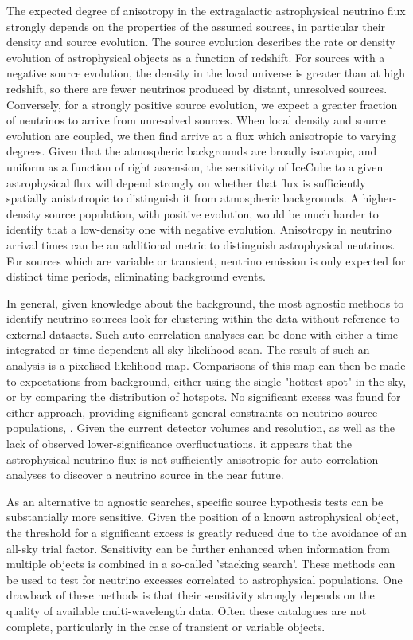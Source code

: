 The expected degree of anisotropy in the extragalactic astrophysical neutrino flux strongly depends on the properties of the assumed sources, in particular their density and source evolution. The source evolution describes the rate or density evolution of astrophysical objects as a function of redshift. For sources with a negative source evolution, the density in the local universe is greater than at high redshift, so there are fewer neutrinos produced by distant, unresolved sources. Conversely, for a strongly positive source evolution, we expect a greater fraction of neutrinos to arrive from unresolved sources. When local density and source evolution are coupled, we then find arrive at a flux which anisotropic to varying degrees. Given that the atmospheric backgrounds are broadly isotropic, and uniform as a function of right ascension, the sensitivity of IceCube to a given astrophysical flux will depend strongly on whether that flux is sufficiently spatially anistotropic to distinguish it from atmospheric backgrounds. A higher-density source population, with positive evolution, would be much harder to identify that a low-density one with negative evolution. Anisotropy in neutrino arrival times can be an additional metric to distinguish astrophysical neutrinos. For sources which are variable or transient, neutrino emission is only expected for distinct time periods, eliminating background events.

In general, given knowledge about the background, the most agnostic methods to identify neutrino sources look for clustering within the data without reference to external datasets. Such auto-correlation analyses can be done with either a time-integrated or time-dependent all-sky likelihood scan. The result of such an analysis is a pixelised likelihood map. Comparisons of this map can then be made to expectations from background, either using the single "hottest spot" in the sky, or by comparing the distribution of hotspots. No significant excess was found for either approach, providing significant general constraints on neutrino source populations, . Given the current detector volumes and resolution, as well as the lack of observed lower-significance overfluctuations, it appears that the astrophysical neutrino flux is not sufficiently anisotropic for auto-correlation analyses to discover a neutrino source in the near future.

As an alternative to agnostic searches, specific source hypothesis tests can be substantially more sensitive. Given the position of a known astrophysical object, the threshold for a significant excess is greatly reduced due to the avoidance of an all-sky trial factor. Sensitivity can be further enhanced when information from multiple objects is combined in a so-called 'stacking search'. These methods can be used to test for neutrino excesses correlated to astrophysical populations. One drawback of these methods is that their sensitivity strongly depends on the quality of available multi-wavelength data. Often these catalogues are not complete, particularly in the case of transient or variable objects. 

